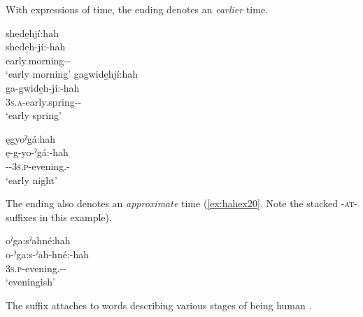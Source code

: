 With expressions of time, the  {\diminutive} ending denotes an \emph{earlier} time. 

\ea\label{ex:hahex2}
\ea shede̱hjí:hah\\\label{ex:hahex2a}
\gll  shede̱h-jí:-hah \\
early.morning-{\intensifier}-{\diminutive}\\
\glt ‘early morning’ 
\ex gagwide̱hjí:hah\\\label{ex:hahex2b}
\gll ga-gwide̱h-jí:-hah\\
\textsc{3s.a}-early.spring-{\intensifier}-{\diminutive}\\
\glt ‘early spring’ 

\ex ęgyoˀgá:hah\\\label{ex:hahex2c}
\gll ę-g-yo-ˀgá:-hah \\
\fut-{\cislocative}-\textsc{3s.p}-evening.{\punctual}-{\diminutive}\\
\glt ‘early night’ 

\z
\z

The  {\diminutive} ending also denotes an \emph{approximate} time (\ref{ex:hahex20}. Note the stacked {\diminutive}-\textsc{at}-{\diminutive} suffixes in this example).

\newpage
\ea\label{ex:hahex20}
oˀga:sˀahné:hah\\
\gll o-ˀga:s-ˀah-hné:-hah\\
 \textsc{3s.p}-evening.{\stative}-{\diminutive}-\\
\glt `eveningish'
\z


The  {\diminutive} suffix attaches to words describing various stages of being human .
 
